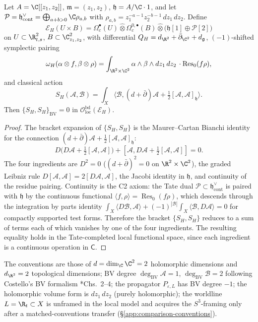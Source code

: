 \begin{thm}
\label{thm:completion-cme}
Let \(A=\C[[z_1,z_2]]\), \(\mathfrak m=(z_1,z_2)\),
\(\mathfrak h=A/\C\cdot 1\), and let
\(\mathcal P=\mathfrak h^\vee_{\mathrm{cont}}=
\bigoplus_{a+b>0}\C\rho_{a,b}\) with
\(\rho_{a,b}=z_1^{-a-1}z_2^{-b-1}\,dz_1\,dz_2\).  Define
\[
  \mathcal E_H(U\times B)
  =\Omega^\bullet_c(U)\widehat\otimes
   \Omega^{0,\bullet}_c(B)\widehat\otimes
   \bigl(\mathfrak h[1]\oplus\mathcal P[2]\bigr)
\]
on \(U\subset\R^2_{t,s}\), \(B\subset\C^2_{z_1,z_2}\), with
differential \(Q_H=d_{\R^2}+\bar\partial_{\C^2}+d_{\mathfrak g}\),
\((-1)\)-shifted symplectic pairing
\[
  \omega_H(\alpha\otimes f,\beta\otimes\rho)
  =\int_{\R^2\times\C^2}\alpha\wedge\beta\wedge dz_1\,dz_2\,
   \cdot\operatorname{Res}_0(f\rho),
\]
and classical action
\[
  S_H(\mathcal A,\mathcal B)
  =\int_X\bigl\langle\mathcal B,
    (d+\bar\partial)\mathcal A
    +\tfrac12[\mathcal A,\mathcal A]_{\mathfrak h}\bigr\rangle.
\]
Then \(\{S_H,S_H\}_{\mathrm{BV}}=0\) in
\(\mathcal O^{\mathrm{bd}}_{\mathrm{loc}}(\mathcal E_H)\).
\end{thm}

\begin{proof}
The bracket expansion of \(\{S_H,S_H\}\) is the Maurer--Cartan
Bianchi identity for the connection \((d+\bar\partial)\mathcal A
+\tfrac12[\mathcal A,\mathcal A]_{\mathfrak h}\):
\[
  D\bigl(D\mathcal A+\tfrac12[\mathcal A,\mathcal A]\bigr)
  +[\mathcal A,D\mathcal A+\tfrac12[\mathcal A,\mathcal A]]
  =0.
\]
The four ingredients are \(D^2=0\)
(\((d+\bar\partial)^2=0\) on \(\R^2\times\C^2\)), the graded Leibniz
rule \(D[\mathcal A,\mathcal A]=2[D\mathcal A,\mathcal A]\), the
Jacobi identity in \(\mathfrak h\), and continuity of the residue
pairing.  Continuity is the C2 axiom: the Tate dual
\(\mathcal P\subset\mathfrak h^\vee_{\mathrm{cont}}\) is paired with
\(\mathfrak h\) by the continuous functional
\(\langle f,\rho\rangle=\operatorname{Res}_0(f\rho)\), which descends
through the integration by parts identity
\(\int_X\langle D\mathcal B,\mathcal A\rangle
+(-1)^{|\mathcal B|}\int_X\langle\mathcal B,D\mathcal A\rangle=0\)
for compactly supported test forms.  Therefore the bracket
\(\{S_H,S_H\}\) reduces to a sum of terms each of which vanishes by
one of the four ingredients.  The resulting equality holds in the
Tate-completed local functional space, since each ingredient is a
continuous operation in \(\mathsf C\).
\end{proof}

\begin{rmk}
\label{rmk:completion-bv-conventions}
The conventions are those of \(d=\dim_\C\C^2=2\) holomorphic dimensions and
\(d_{\R^2}=2\) topological dimensions; BV degree
\(\deg_{\mathrm{BV}}\mathcal A=1\), \(\deg_{\mathrm{BV}}\mathcal B=2\)
following Costello's BV formalism
\cite{costello-renormalization}*{Chs.~2--4}; the propagator
\(P_{\varepsilon,L}\) has BV degree \(-1\); the holomorphic volume
form is \(dz_1\,dz_2\) (purely holomorphic); the worldline
\(L=\R_t\subset X\) is unframed in the local model and acquires the
\(S^3\)-framing only after a matched-conventions transfer
(\S\ref{app:comparison-conventions}).
\end{rmk}

